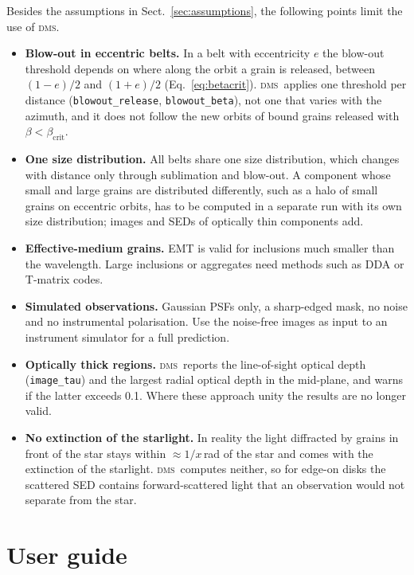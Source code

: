 \documentclass[11pt,a4paper]{article}
\newcommand{\dms}{\textsc{dms}}
\newcommand{\code}[1]{\texttt{#1}}
\begin{document}
Besides the assumptions in Sect.~\ref{sec:assumptions}, the following points limit the use of \dms.
\begin{itemize}
\item \textbf{Blow-out in eccentric belts.} In a belt with eccentricity $e$ the blow-out threshold
      depends on where along the orbit a grain is released, between $(1-e)/2$ and $(1+e)/2$
      (Eq.~\ref{eq:betacrit}). \dms\ applies one threshold per distance
      (\code{blowout\_release}, \code{blowout\_beta}), not one that varies with the azimuth, and it
      does not follow the new orbits of bound grains released with $\beta<\beta_\mathrm{crit}$.
\item \textbf{One size distribution.} All belts share one size distribution, which changes with
      distance only through sublimation and blow-out. A component whose small and large grains
      are distributed differently, such as a halo of small grains on eccentric orbits, has to be
      computed in a separate run with its own size distribution; images and SEDs of optically thin
      components add.
\item \textbf{Effective-medium grains.} EMT is valid for inclusions much smaller than the
      wavelength. Large inclusions or aggregates need methods such as DDA or T-matrix codes.
\item \textbf{Simulated observations.} Gaussian PSFs only, a sharp-edged mask, no noise and no
      instrumental polarisation. Use the noise-free images as input to an instrument simulator for
      a full prediction.
\item \textbf{Optically thick regions.} \dms\ reports the line-of-sight optical depth
      (\code{image\_tau}) and the largest radial optical depth in the mid-plane, and warns if the
      latter exceeds 0.1. Where these approach unity the results are no longer valid.
\item \textbf{No extinction of the starlight.} In reality the light diffracted by grains in front of
      the star stays within $\approx1/x$\,rad of the star and comes with the extinction of the
      starlight. \dms\ computes neither, so for edge-on disks the scattered SED contains
      forward-scattered light that an observation would not separate from the star.
\end{itemize}

\part{User guide}
\end{document}
